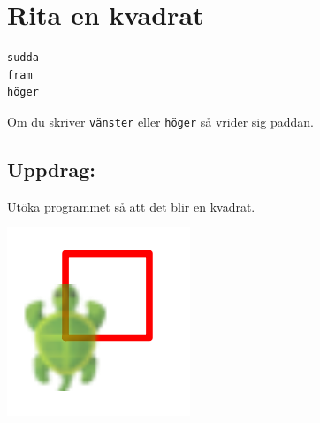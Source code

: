 \chapter{Rita en kvadrat}
\begin{multicols}{2}

\begin{lstlisting}[basicstyle={\ttfamily\fontsize{36}{43}\selectfont},numbers=none]
sudda
fram
höger
\end{lstlisting}
        
Om du skriver \lstinline{vänster} eller \lstinline{höger} så vrider sig paddan.
\section*{\color{BrickRed}Uppdrag:}
Utöka programmet så att det blir en kvadrat.

\columnbreak

\begin{center}
\includegraphics{../img/square.png}
\end{center}

\end{multicols}

